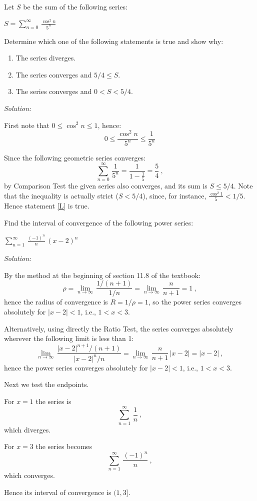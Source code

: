 \documentclass[12pt]{article}
\newcommand{\solution}[2]{\ifthenelse{\boolean{showsol}}%
{\vskip10pt\noindent\emph{Solution:}\vskip10pt #2}{\vskip #1}}
\newcommand{\pnum}[1]{\noindent {\hskip -18pt \bfseries #1.}}
\begin{document}
\clearpage



\pnum{3} Let $S$ be the sum of the following series:

$\displaystyle{S = \sum_{n=0}^\infty\,\frac{\cos^2{n}}{5^n}}$

Determine which one of the following statements is true and 
show why:

\begin{enumerate}
\item The series diverges.
\item The series converges and $5/4 \leq S$.
\item \label{L} The series converges and $0 < S < 5/4$.
\end{enumerate}

\solution{2.5in}{\par
First note that $0 \leq \cos^2{n} \leq 1$, hence:
\[
0 \leq \frac{\cos^2{n}}{5^n} \leq \frac{1}{5^n}
\]

Since the following geometric series converges:
\[
\sum_{n=0}^\infty\,\frac{1}{5^n} = 
\frac{1}{1-\frac{1}{5}} = \frac{5}{4}\ ,
\]
by Comparison Test the given series also converges, and its sum is 
$S\leq 5/4$.  Note that the inequality is actually strict 
($S < 5/4$), since, for instance, 
$\frac{\cos^2{1}}{5} < 1/5$.  
Hence statement \ref{L} is true.  }


\clearpage



\pnum{4} Find the interval of convergence of the following 
power series:

$\displaystyle{\sum_{n=1}^\infty\,\frac{(-1)^n}{n}\,(x-2)^n}$

\solution{2.5in}{\par

By the method at the beginning of section 11.8 of the textbook:
\[
\rho = 
\lim_{n\to\infty}\,\frac{1/(n+1)}{1/n} =
\lim_{n\to\infty}\,\frac{n}{n+1} = 1\ ,
\]
hence the radius of convergence is $R = 1/\rho = 1$, so the power
series converges absolutely for $|x-2|<1$, i.e., $1 < x < 3$.

Alternatively, using directly the Ratio Test, the series converges
absolutely wherever the following limit is less than 1:
\[
\lim_{n\to\infty}\,\frac{|x-2|^{n+1}/(n+1)}{|x-2|^n/n} =
\lim_{n\to\infty}\,\frac{n}{n+1}\,|x-2| = |x-2|\ ,
\]
hence the power series converges absolutely for $|x-2|<1$, i.e., 
$1 < x < 3$.

Next we test the endpoints. 

For $x=1$ the series is
\[
\sum_{n=1}^\infty\,\frac{1}{n}\ ,
\]
which diverges.

For $x=3$ the series becomes 
\[
\sum_{n=1}^\infty\,\frac{(-1)^n}{n}\ ,
\]
which converges.

Hence its interval of convergence is $(1,3]$.
}
\end{document}
